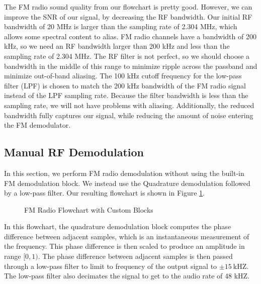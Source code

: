 \documentclass{article}
\begin{document}
The FM radio sound quality from our flowchart is pretty good. However, we can improve the SNR of our signal, by decreasing the RF bandwidth. Our initial RF bandwidth of 20 MHz is larger than the sampling rate of 2.304 MHz, which allows some spectral content to alias. FM radio channels have a bandwidth of 200 kHz, so we need an RF bandwidth larger than 200 kHz and less than the sampling rate of 2.304 MHz. The RF filter is not perfect, so we should choose a bandwidth in the middle of this range to minimize ripple across the passband and minimize out-of-band aliasing. The 100 kHz cutoff frequency for the low-pass filter (LPF) is chosen to match the 200 kHz bandwidth of the FM radio signal instead of the LPF sampling rate. Because the filter bandwidth is less than the sampling rate, we will not have problems with aliasing. Additionally, the reduced bandwidth fully captures our signal, while reducing the amount of noise entering the FM demodulator.

\subsection{Manual RF Demodulation}

In this section, we perform FM radio demodulation without using the built-in FM demodulation block. We instead use the Quadrature demodulation followed by a low-pass filter. Our resulting flowchart is shown in Figure \ref{fig::fm_radio_user_flowchart}.

\begin{figure}[H]
	\centerline{}
	\caption{FM Radio Flowchart with Custom Blocks}
	\label{fig::fm_radio_user_flowchart}
\end{figure}

\noindent In this flowchart, the quadrature demodulation block computes the phase difference between adjacent samples, which is an instantaneous measurement of the frequency. This phase difference is then scaled to produce an amplitude in range $[0, 1)$. The phase difference between adjacent samples is then passed through a low-pass filter to limit to frequency of the output signal to $\pm 15\ \text{kHZ}$. The low-pass filter also decimates the signal to get to the audio rate of 48 kHZ.
\end{document}
